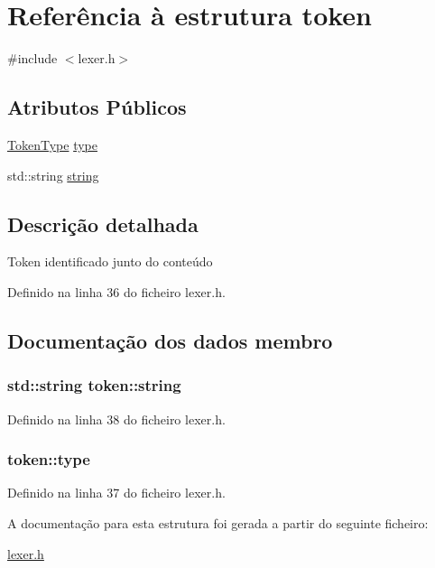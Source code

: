 \hypertarget{structtoken}{\section{Referência à estrutura token}
\label{structtoken}
}


{\ttfamily \#include $<$lexer.\-h$>$}

\subsection*{Atributos Públicos}
\begin{DoxyCompactItemize}
\item 
\hyperlink{lexer_8h_aa520fbf142ba1e7e659590c07da31921}{Token\-Type} \hyperlink{structtoken_a0ccfb094c0dce37e1bae7d990c06cc92}{type}
\item 
std\-::string \hyperlink{structtoken_a2150b4d92215b15d0c62c40cafd407ba}{string}
\end{DoxyCompactItemize}


\subsection{Descrição detalhada}
Token identificado junto do conteúdo 

Definido na linha 36 do ficheiro lexer.\-h.



\subsection{Documentação dos dados membro}
\hypertarget{structtoken_a2150b4d92215b15d0c62c40cafd407ba}{
\subsubsection[{string}]{\setlength{\rightskip}{0pt plus 5cm}std\-::string token\-::string}}\label{structtoken_a2150b4d92215b15d0c62c40cafd407ba}


Definido na linha 38 do ficheiro lexer.\-h.

\hypertarget{structtoken_a0ccfb094c0dce37e1bae7d990c06cc92}{
\subsubsection[{type}]{ token\-::type}}\label{structtoken_a0ccfb094c0dce37e1bae7d990c06cc92}


Definido na linha 37 do ficheiro lexer.\-h.



A documentação para esta estrutura foi gerada a partir do seguinte ficheiro\-:\begin{DoxyCompactItemize}
\item 
\hyperlink{lexer_8h}{lexer.\-h}\end{DoxyCompactItemize}
